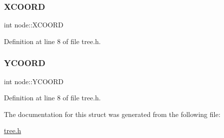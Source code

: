 \mbox{\label{structnode_a59e7f1df82b9686721a6770247a16d49}} 
\subsubsection{\texorpdfstring{X\+C\+O\+O\+RD}{XCOORD}}
{\footnotesize\ttfamily int node\+::\+X\+C\+O\+O\+RD}



Definition at line 8 of file tree.\+h.

\mbox{\label{structnode_a8e213b00fc3c2193c4c5d2cc9e691f62}} 
\subsubsection{\texorpdfstring{Y\+C\+O\+O\+RD}{YCOORD}}
{\footnotesize\ttfamily int node\+::\+Y\+C\+O\+O\+RD}



Definition at line 8 of file tree.\+h.



The documentation for this struct was generated from the following file\+:\begin{DoxyCompactItemize}
\item 
\mbox{\hyperlink{tree_8h}{tree.\+h}}\end{DoxyCompactItemize}
